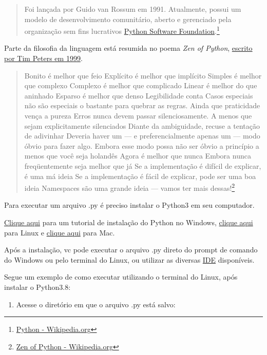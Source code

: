 \documentclass[
]{book}
\providecommand{\tightlist}{%
  \setlength{\itemsep}{0pt}\setlength{\parskip}{0pt}}
\begin{document}
\begin{quote}
Foi lançada por Guido van Rossum em 1991. Atualmente, possui um modelo de desenvolvimento comunitário, aberto e gerenciado pela organização sem fins lucrativos \href{https://www.python.org/psf/}{Python Software Foundation}.\footnote{\href{https://pt.wikipedia.org/wiki/Python}{Python - Wikipedia.org}}
\end{quote}

Parte da filosofia da linguagem está resumida no poema \emph{Zen of Python}, \href{https://pt.wikipedia.org/wiki/Python}{escrito por Tim Peters em 1999}.

\begin{quote}
Bonito é melhor que feio
Explícito é melhor que implícito
Simples é melhor que complexo
Complexo é melhor que complicado
Linear é melhor do que aninhado
Esparso é melhor que denso
Legibilidade conta
Casos especiais não são especiais o bastante para quebrar as regras.
Ainda que praticidade vença a pureza
Erros nunca devem passar silenciosamente.
A menos que sejam explicitamente silenciados
Diante da ambiguidade, recuse a tentação de adivinhar
Deveria haver um --- e preferencialmente apenas um --- modo óbvio para fazer algo.
Embora esse modo possa não ser óbvio a princípio a menos que você seja holandês
Agora é melhor que nunca
Embora nunca freqüentemente seja melhor que já
Se a implementação é difícil de explicar, é uma má ideia
Se a implementação é fácil de explicar, pode ser uma boa ideia
Namespaces são uma grande ideia --- vamos ter mais dessas!\footnote{\href{https://pt.wikipedia.org/wiki/Zen_of_Python}{Zen of Python - Wikipedia.org}}
\end{quote}

Para executar um arquivo .py é preciso instalar o Python3 em seu computador.

\href{https://python.org.br/instalacao-windows/}{Clique aqui} para um tutorial de instalação do Python no Windows, \href{https://python.org.br/instalacao-linux/}{clique aqui} para Linux e \href{https://python.org.br/instalacao-mac/}{clique aqui}
para Mac.

Após a instalação, vc pode executar o arquivo .py direto do prompt de comando do Windows ou pelo terminal do Linux, ou utilizar as diversas \href{https://pt.wikipedia.org/wiki/Ambiente_de_desenvolvimento_integrado}{IDE} disponíveis.

Segue um exemplo de como executar utilizando o terminal do Linux, após instalar o Python3.8:

\begin{enumerate}
\def\labelenumi{\arabic{enumi}.}
\tightlist
\item
  Acesse o diretório em que o arquivo .py está salvo:
\end{enumerate}
\end{document}

